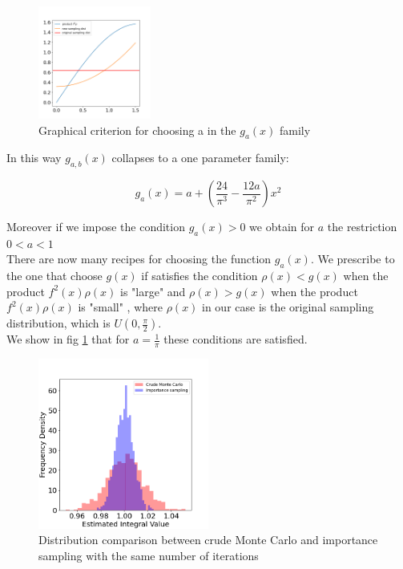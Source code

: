\begin{figure}
    \vspace{-25pt}
    \centering
    \includegraphics[width=0.33\textwidth]{FIG/exercise_3_images/choice_sampling_function.png}
  \caption{Graphical criterion for choosing a in the $g_a(x)$ family}
  \label{choice_g}
  \end{figure}

In this way $g_{a,b}(x)$ collapses to a one parameter family:

$$ g_{a}(x) = a+ \left( \frac{24}{\pi^3} - \frac{12 a}{\pi^2} \right) x^2 $$

Moreover if we impose the condition $g_{a}(x) > 0$ we obtain for $a$ the restriction $ 0 < a < 1 $ \\

There are now many recipes for choosing the function $g_a(x)$. We prescribe to the one that choose $g(x)$ if satisfies the condition 
$\rho(x)<g(x)$ when the product $f^2(x)\rho(x)$ is "large" and $\rho(x)>g(x)$ when the product $f^2(x)\rho(x)$ is "small" , 
where $\rho(x)$ in our case is the original sampling distribution, which is $U(0, \frac{\pi}{2})$. \\
We show in fig \ref{choice_g} that for $a = \frac{1}{\pi}$ these conditions are satisfied. \\

\begin{figure}[H]
    \centering
    \includegraphics[width=0.5\textwidth]{FIG/exercise_3_images/distribution_comparison.png}
    \caption{Distribution comparison between crude Monte Carlo and importance sampling with the same number of iterations}
    \label{distribution_comparison}
    \end{figure}

